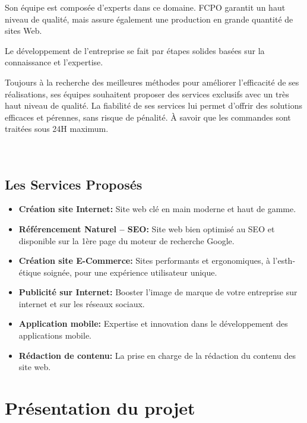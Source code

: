 \vspace{12pt}
Son équipe est composée d'experts dans ce domaine. FCPO garantit un haut
niveau de qualité, mais assure également une production en grande quantité
de sites Web.

\vspace{12pt}
Le développement de l'entreprise se fait par étapes solides basées sur la
connaissance et l'expertise.

\vspace{12pt}
Toujours à la recherche des meilleures méthodes
pour améliorer l’efficacité de ses réalisations, ses équipes souhaitent proposer
des services exclusifs avec un très haut niveau de qualité. La fiabilité de ses
services lui permet d'offrir des solutions efficaces et pérennes, sans
risque de pénalité. À savoir que les commandes sont traitées sous 24H maximum.\\ \\ \\

\subsection{Les Services Proposés}

\begin{itemize}
  \item \textbf{Création site Internet: }Site web clé en main moderne et haut de gamme.
  \item \textbf{Référencement Naturel – SEO: }Site web bien optimisé au SEO et disponible sur la 1ère page du moteur de recherche Google.
  \item \textbf{Création site E-Commerce: }Sites performants et ergonomiques, à l'esth-étique soignée, pour une expérience utilisateur unique.
  \item \textbf{Publicité sur Internet: }Booster l'image de marque de votre entreprise sur internet et sur les réseaux sociaux.
  \item \textbf{Application mobile: }Expertise et innovation dans le développement des applications mobile.
  \item \textbf{Rédaction de contenu: }La prise en charge de la rédaction du contenu des site web.

\end{itemize}






\section{Présentation du projet}



